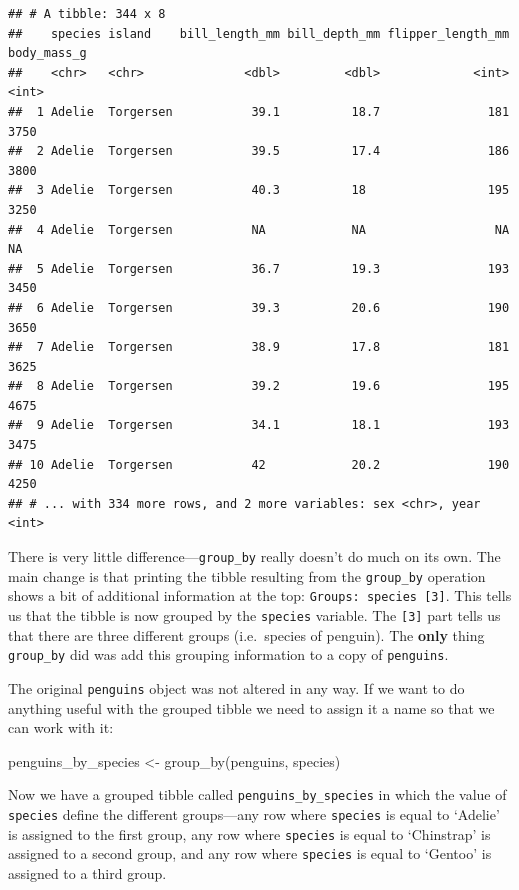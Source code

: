 \documentclass[
]{book}
\newenvironment{Shaded}{\begin{snugshade}}{\end{snugshade}}
\newcommand{\FunctionTok}[1]{\textcolor[rgb]{0.00,0.00,0.00}{#1}}
\newcommand{\NormalTok}[1]{#1}
\newcommand{\OtherTok}[1]{\textcolor[rgb]{0.56,0.35,0.01}{#1}}
\begin{document}
\begin{verbatim}
## # A tibble: 344 x 8
##    species island    bill_length_mm bill_depth_mm flipper_length_mm body_mass_g
##    <chr>   <chr>              <dbl>         <dbl>             <int>       <int>
##  1 Adelie  Torgersen           39.1          18.7               181        3750
##  2 Adelie  Torgersen           39.5          17.4               186        3800
##  3 Adelie  Torgersen           40.3          18                 195        3250
##  4 Adelie  Torgersen           NA            NA                  NA          NA
##  5 Adelie  Torgersen           36.7          19.3               193        3450
##  6 Adelie  Torgersen           39.3          20.6               190        3650
##  7 Adelie  Torgersen           38.9          17.8               181        3625
##  8 Adelie  Torgersen           39.2          19.6               195        4675
##  9 Adelie  Torgersen           34.1          18.1               193        3475
## 10 Adelie  Torgersen           42            20.2               190        4250
## # ... with 334 more rows, and 2 more variables: sex <chr>, year <int>
\end{verbatim}

There is very little difference---\texttt{group\_by} really doesn't do much on its own. The main change is that printing the tibble resulting from the \texttt{group\_by} operation shows a bit of additional information at the top: \texttt{Groups:\ species\ {[}3{]}}. This tells us that the tibble is now grouped by the \texttt{species} variable. The \texttt{{[}3{]}} part tells us that there are three different groups (i.e.~species of penguin). The \textbf{only} thing \texttt{group\_by} did was add this grouping information to a copy of \texttt{penguins}.

The original \texttt{penguins} object was not altered in any way. If we want to do anything useful with the grouped tibble we need to assign it a name so that we can work with it:

\begin{Shaded}
\begin{Highlighting}[]
\NormalTok{penguins\_by\_species }\OtherTok{\textless{}{-}} \FunctionTok{group\_by}\NormalTok{(penguins, species)}
\end{Highlighting}
\end{Shaded}

Now we have a grouped tibble called \texttt{penguins\_by\_species} in which the value of \texttt{species} define the different groups---any row where \texttt{species} is equal to `Adelie' is assigned to the first group, any row where \texttt{species} is equal to `Chinstrap' is assigned to a second group, and any row where \texttt{species} is equal to `Gentoo' is assigned to a third group.
\end{document}
